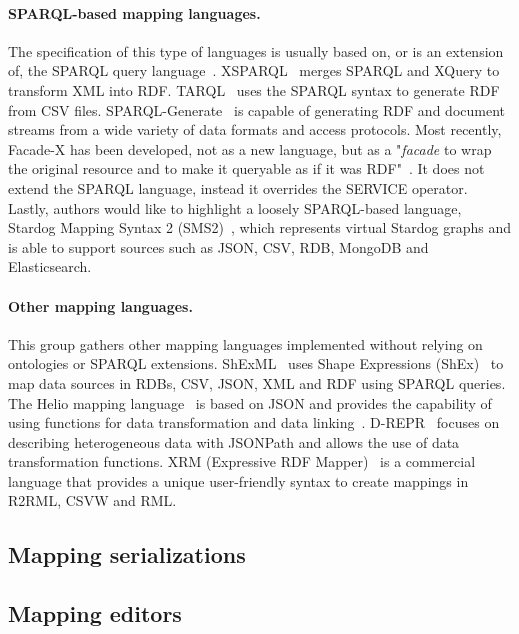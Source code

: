 \noindent\paragraph{\textbf{SPARQL-based mapping languages.}} The specification of this type of languages is usually based on, or is an extension of, the SPARQL query language~\citep{harris2013sparql}. XSPARQL~\citep{Bischof2012xsparql} merges SPARQL and XQuery to transform XML into RDF. TARQL~\citep{tarql} uses the SPARQL syntax to generate RDF from CSV files. SPARQL-Generate~\citep{Lefrancois2017sparqlgenerate} is capable of generating RDF and document streams from a wide variety of data formats and access protocols. Most recently, Facade-X has been developed, not as a new language, but as a "\textit{facade} to wrap the original resource and to make it queryable as if it was RDF"~\citep{asprino2023sparql-anything}. It does not extend the SPARQL language, instead it overrides the SERVICE operator. Lastly, authors would like to highlight a loosely SPARQL-based language, Stardog Mapping Syntax 2 (SMS2)~\citep{sms2}, which represents virtual Stardog graphs and is able to support sources such as JSON, CSV, RDB, MongoDB and Elasticsearch.

\noindent\paragraph{\textbf{Other mapping languages.}} This group gathers other mapping languages implemented without relying on ontologies or SPARQL extensions. ShExML~\citep{Garcia-Gonzalez2020shexml,garcia2021shexml-challenges} uses Shape Expressions (ShEx)~\citep{prud2014shex} to map data sources in RDBs, CSV, JSON, XML and RDF using SPARQL queries. The Helio mapping language~\citep{cimmino2022helio} is based on JSON and provides the capability of using functions for data transformation and data linking~\citep{cimmino2018hybrid}. D-REPR~\citep{Vu2019d-repr} focuses on describing heterogeneous data with JSONPath and allows the use of data transformation functions. XRM (Expressive RDF Mapper)~\citep{xrm} is a commercial language that provides a unique user-friendly syntax to create mappings in R2RML, CSVW and RML.


\subsection{Mapping serializations}



\subsection{Mapping editors}



